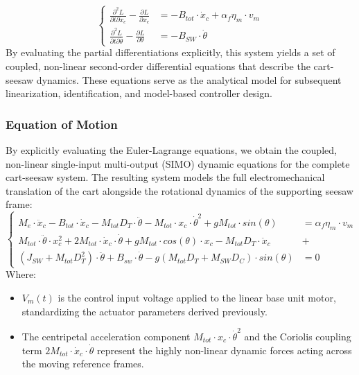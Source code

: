 \documentclass[11pt,a4paper]{article}
\begin{document}
\begin{equation}
	\left\{
	\begin{aligned}
		\frac{\partial^2L}{\partial t \partial \dot{x}_c} - \frac{\partial L}{\partial x_c}       & = - B_{tot} \cdot \dot{x}_c +  \alpha_f \eta_m \cdot v_m\\
		\frac{\partial^2L}{\partial t \partial \dot{\theta}} - \frac{\partial L}{\partial \theta} & = - B_{SW} \cdot \dot{\theta}
	\end{aligned}
	\right.
\end{equation}
By evaluating the partial differentiations explicitly, this system yields a set of coupled, non-linear second-order differential equations that describe the cart-seesaw dynamics. These equations serve as the analytical model for subsequent linearization, identification, and model-based controller design.

\subsubsection{Equation of Motion}\label{subsub:seesaw_eom}
By explicitly evaluating the Euler-Lagrange equations, we obtain the coupled, non-linear single-input multi-output (SIMO) dynamic equations for the complete cart-seesaw system. The resulting system models the full electromechanical translation of the cart alongside the rotational dynamics of the supporting seesaw frame:
\begin{equation}
	\label{eq:seesaw_eom}
	\left\{
	\begin{aligned}
		M_e \cdot \ddot{x}_c - B_{tot} \cdot \dot{x}_c - M_{tot} D_T \cdot \ddot{\theta} - M_{tot} \cdot x_c \cdot \dot{\theta}^2 + g M_{tot} \cdot sin(\theta)                 & =   \alpha_f \eta_m \cdot v_m \\
		M_{tot} \cdot \ddot{\theta} \cdot x_c^2 + 2 M_{tot} \cdot \dot{x}_c \cdot \dot{\theta} + g M_{tot} \cdot cos(\theta) \cdot x_c - M_{tot} D_T \cdot \ddot{x}_c & +                            \\
		(J_{SW} + M_{tot} D^2_T) \cdot \ddot{\theta} + B_{sw} \cdot \dot{\theta} - g(M_{tot} D_T + M_{SW}D_C) \cdot sin(\theta)                             & = 0
	\end{aligned}
	\right.
\end{equation}
Where:
\begin{itemize}
    \item $V_m(t)$ is the control input voltage applied to the linear base unit motor, standardizing the actuator parameters derived previously.
    \item The centripetal acceleration component $M_{tot} \cdot x_c \cdot \dot{\theta}^2$ and the Coriolis coupling term $2 M_{tot} \cdot \dot{x}_c \cdot \dot{\theta}$ represent the highly non-linear dynamic forces acting across the moving reference frames.
\end{itemize}
\end{document}

